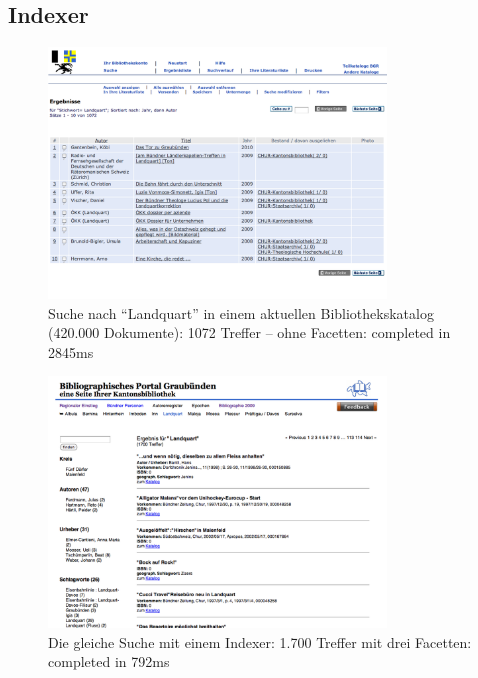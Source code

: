     \subsection{Indexer}
      \begin{frame}
        \begin{figure}
          \caption{Suche nach ``Landquart'' in einem aktuellen Bibliothekskatalog (420.000 Dokumente): 1072 Treffer -- ohne Facetten: completed in 2845ms}
          \begin{center}
            \includegraphics[width=0.8\textwidth]{pics/aleph}
          \end{center}
        \end{figure}
      \end{frame}

      \begin{frame}
        \begin{figure}
          \caption{Die gleiche Suche mit einem Indexer: 1.700 Treffer mit drei Facetten: completed in 792ms}
          \begin{center}
            \includegraphics[width=0.8\textwidth]{pics/Ergebnis}
          \end{center}
        \end{figure}
      \end{frame}